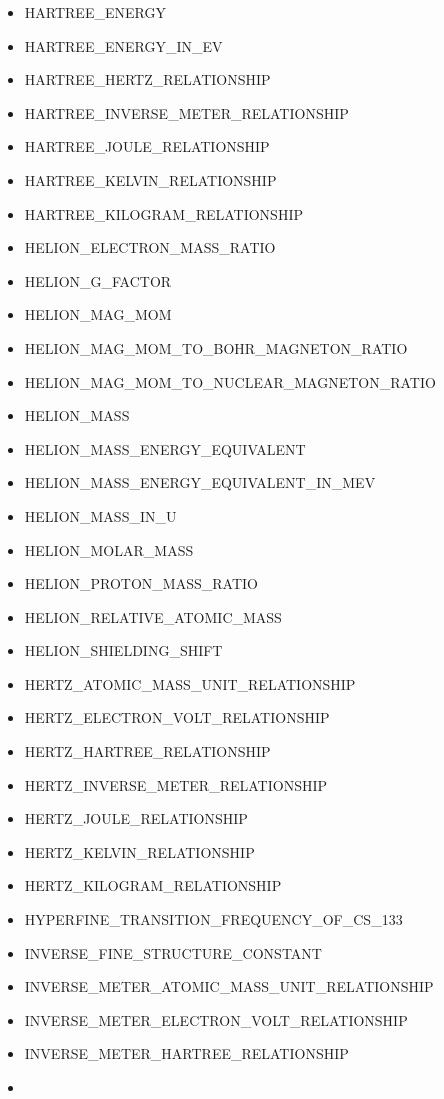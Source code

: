 \begin{itemize}
  HARTREE\_ELECTRON\_VOLT\_RELATIONSHIP
\item
  HARTREE\_ENERGY
\item
  HARTREE\_ENERGY\_IN\_EV
\item
  HARTREE\_HERTZ\_RELATIONSHIP
\item
  HARTREE\_INVERSE\_METER\_RELATIONSHIP
\item
  HARTREE\_JOULE\_RELATIONSHIP
\item
  HARTREE\_KELVIN\_RELATIONSHIP
\item
  HARTREE\_KILOGRAM\_RELATIONSHIP
\item
  HELION\_ELECTRON\_MASS\_RATIO
\item
  HELION\_G\_FACTOR
\item
  HELION\_MAG\_MOM
\item
  HELION\_MAG\_MOM\_TO\_BOHR\_MAGNETON\_RATIO
\item
  HELION\_MAG\_MOM\_TO\_NUCLEAR\_MAGNETON\_RATIO
\item
  HELION\_MASS
\item
  HELION\_MASS\_ENERGY\_EQUIVALENT
\item
  HELION\_MASS\_ENERGY\_EQUIVALENT\_IN\_MEV
\item
  HELION\_MASS\_IN\_U
\item
  HELION\_MOLAR\_MASS
\item
  HELION\_PROTON\_MASS\_RATIO
\item
  HELION\_RELATIVE\_ATOMIC\_MASS
\item
  HELION\_SHIELDING\_SHIFT
\item
  HERTZ\_ATOMIC\_MASS\_UNIT\_RELATIONSHIP
\item
  HERTZ\_ELECTRON\_VOLT\_RELATIONSHIP
\item
  HERTZ\_HARTREE\_RELATIONSHIP
\item
  HERTZ\_INVERSE\_METER\_RELATIONSHIP
\item
  HERTZ\_JOULE\_RELATIONSHIP
\item
  HERTZ\_KELVIN\_RELATIONSHIP
\item
  HERTZ\_KILOGRAM\_RELATIONSHIP
\item
  HYPERFINE\_TRANSITION\_FREQUENCY\_OF\_CS\_133
\item
  INVERSE\_FINE\_STRUCTURE\_CONSTANT
\item
  INVERSE\_METER\_ATOMIC\_MASS\_UNIT\_RELATIONSHIP
\item
  INVERSE\_METER\_ELECTRON\_VOLT\_RELATIONSHIP
\item
  INVERSE\_METER\_HARTREE\_RELATIONSHIP
\item

\end{itemize}

